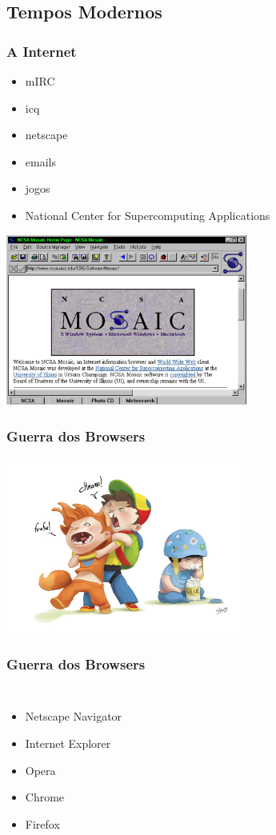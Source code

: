 \documentclass{beamer}
\begin{document}
\subsection{Tempos Modernos}
\begin{frame} \frametitle{A Internet}
     \begin{itemize}
      \item mIRC
      \item icq
      \item netscape
      \item emails
      \item jogos
      \item National Center for Supercomputing Applications
     \end{itemize}
\end{frame}

\begin{frame}
     \includegraphics[width=300px]{images/mosaic}
\end{frame}

\begin{frame} \frametitle{Guerra dos Browsers}
    \includegraphics[width=300px]{images/browser-war}
\end{frame}

\begin{frame} \frametitle{Guerra dos Browsers}
    \begin{columns}
        \begin{itemize}
  \item Netscape Navigator
  \item Internet Explorer
  \item Opera
  \item Chrome
  \item Firefox
        \end{itemize}
    \end{columns}
\end{frame}
\end{document}
